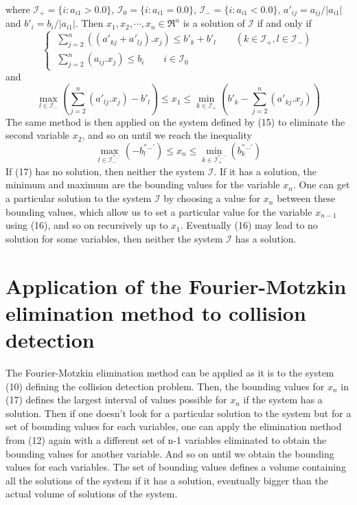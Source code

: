 \documentclass[12pt, a4paper]{article}
\begin{document}
where $\mathcal{I}_+=\{i:a_{i1}>0.0\}$, $\mathcal{I}_0=\{i:a_{i1}=0.0\}$, $\mathcal{I}_-=\{i:a_{i1}<0.0\}$, $a'_{ij}=a_{ij}/|a_{i1}|$ and $b'_i=b_i/|a_{i1}|$.
Then $x_1, x_2, \cdots, x_n\in\Re^n$ is a solution of $\mathcal{I}$ if and only if
\begin{equation}
\left\{\
\begin{array}{c}
\sum_{j=2}^n((a'_{kj}+a'_{lj}).x_j)\le b'_k+b'_l \qquad (k\in\mathcal{I}_+, l\in\mathcal{I}_-)\\
\sum_{j=2}^n(a_{ij}.x_j)\le b_i \qquad i\in\mathcal{I}_0
\end{array}
\right.
\end{equation}
and
\begin{equation}
\max_{l\in\mathcal{I}_-}(\sum_{j=2}^n(a'_{lj}.x_j)-b'_l)\le x_1\le\min_{k\in\mathcal{I}_+}(b'_k-\sum_{j=2}^n(a'_{kj}.x_j))
\end{equation}
The same method is then applied on the system defined by (15) to eliminate the second variable $x_2$, and so on until we reach the inequality
\begin{equation}
\max_{l\in\mathcal{I}^{''...'}_-}(-b^{''...'}_l)\le x_n\le\min_{k\in\mathcal{I}^{''...'}_+}(b^{''...'}_k)
\end{equation}
If (17) has no solution, then neither the system $\mathcal{I}$. If it has a solution, the minimum and maximum are the bounding values for the variable $x_n$. One can get a particular solution to the system $\mathcal{I}$ by choosing a value for $x_n$ between these bounding values, which allow us to set a particular value for the variable $x_{n-1}$ using (16), and so on recursively up to $x_1$. Eventually (16) may lead to no solution for some variables, then neither the system $\mathcal{I}$ has a solution. 

\section{Application of the Fourier-Motzkin elimination method to collision detection}

The Fourier-Motzkin elimination method can be applied as it is to the system (10) defining the collision detection problem. Then, the bounding values for $x_n$ in (17) defines the largest interval of values possible for $x_n$ if the system has a solution. Then if one doesn't look for a particular solution to the system but for a set of bounding values for each variables, one can apply the elimination method from (12) again with a different set of n-1 variables eliminated to obtain the bounding values for another variable. And so on until we obtain the bounding values for each variables. The set of bounding values defines a volume containing all the solutions of the system if it has a solution, eventually bigger than the actual volume of solutions of the system. 
\end{document}
